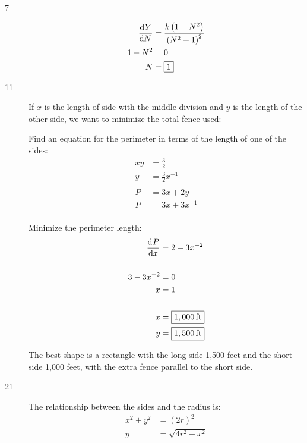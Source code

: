\documentclass[letterpaper, landscape]{exam}
\begin{document}
  \begin{description}
    \item[7]
      \begin{align*}
        \dod{Y}{N} & = \frac{ k \del{ 1 - N^2 } }{ \del{ N^2 + 1 }^2 }
        \\
        1 - N^2    & = 0 \\
        N          & = \boxed{ 1 } \\
      \end{align*}

    \newpage

    \item[11]
      If $x$ is the length of side with the middle division and $y$ is the length of the other side,
      we want to minimize the total fence used:

      Find an equation for the perimeter in terms of the length of one of the sides:
      \begin{align*}
        xy & = \frac{3}{2} \\
        y  & = \frac{3}{2} x^{-1} \\
        \\
        P & = 3x + 2y \\
        P & = 3x + 3x^{-1} \\
      \end{align*}

      Minimize the perimeter length:
      \begin{align*}
        \dod{P}{x}  & = 2 - 3x^{-2} \\
        \\
        3 - 3x^{-2} & = 0 \\
        x           & = 1 \\
        \\
        x  & = \boxed{ \unit[1,000]{ft} } \\
        y  & = \boxed{ \unit[1,500]{ft} } \\
      \end{align*}

      The best shape is a rectangle with the long side 1,500 feet and the short side 1,000
      feet, with the extra fence parallel to the short side.

    \item[21]
      The relationship between the sides and the radius is:
      \begin{align*}
        x^2 + y^2 & = (2r)^2 \\
        y         & = \sqrt{4r^2 - x^2} \\
      \end{align*}


\end{description}
\end{document}
